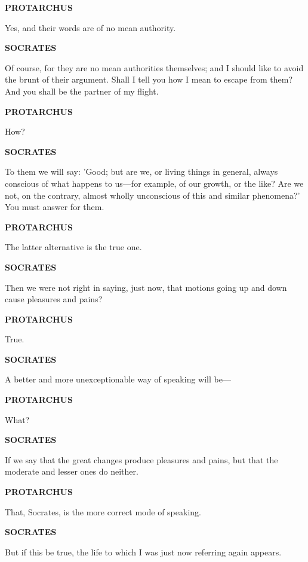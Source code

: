 \documentclass[11pt,letter]{article}
\begin{document}
\par \textbf{PROTARCHUS}
\par   Yes, and their words are of no mean authority.

\par \textbf{SOCRATES}
\par   Of course, for they are no mean authorities themselves; and I should like to avoid the brunt of their argument. Shall I tell you how I mean to escape from them? And you shall be the partner of my flight.

\par \textbf{PROTARCHUS}
\par   How?

\par \textbf{SOCRATES}
\par   To them we will say:  'Good; but are we, or living things in general, always conscious of what happens to us—for example, of our growth, or the like? Are we not, on the contrary, almost wholly unconscious of this and similar phenomena?' You must answer for them.

\par \textbf{PROTARCHUS}
\par   The latter alternative is the true one.

\par \textbf{SOCRATES}
\par   Then we were not right in saying, just now, that motions going up and down cause pleasures and pains?

\par \textbf{PROTARCHUS}
\par   True.

\par \textbf{SOCRATES}
\par   A better and more unexceptionable way of speaking will be—

\par \textbf{PROTARCHUS}
\par   What?

\par \textbf{SOCRATES}
\par   If we say that the great changes produce pleasures and pains, but that the moderate and lesser ones do neither.

\par \textbf{PROTARCHUS}
\par   That, Socrates, is the more correct mode of speaking.

\par \textbf{SOCRATES}
\par   But if this be true, the life to which I was just now referring again appears.
\end{document}
